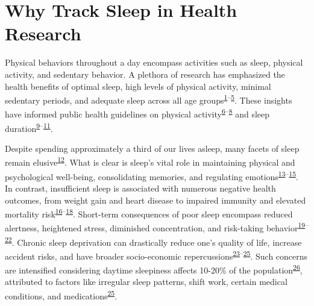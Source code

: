 \documentclass[
  10pt,
]{scrbook}
\begin{document}
\hypertarget{why-track-sleep-in-health-research}{%
\section{Why Track Sleep in Health
Research}\label{why-track-sleep-in-health-research}}

Physical behaviors throughout a day encompass activities such as sleep,
physical activity, and sedentary behavior. A plethora of research has
emphasized the health benefits of optimal sleep, high levels of physical
activity, minimal sedentary periods, and adequate sleep across all age
groups\textsuperscript{\protect\hyperlink{ref-kraus_physical_2019}{1}--\protect\hyperlink{ref-jennum_suxf8vn_sundhed_2015}{5}}.
These insights have informed public health guidelines on physical
activity\textsuperscript{\protect\hyperlink{ref-piercy_physical_2018}{6}--\protect\hyperlink{ref-Sundhedsstyrelsen2023_unge}{8}}
and sleep
duration\textsuperscript{\protect\hyperlink{ref-hirshkowitz_2015}{9}--\protect\hyperlink{ref-watson_2015}{11}}.

Despite spending approximately a third of our lives asleep, many facets
of sleep remain
elusive\textsuperscript{\protect\hyperlink{ref-ma_sleep_2017}{12}}. What
is clear is sleep's vital role in maintaining physical and psychological
well-being, consolidating memories, and regulating
emotions\textsuperscript{\protect\hyperlink{ref-worley_2018}{13}--\protect\hyperlink{ref-scott_2021}{15}}.
In contrast, insufficient sleep is associated with numerous negative
health outcomes, from weight gain and heart disease to impaired immunity
and elevated mortality
risk\textsuperscript{\protect\hyperlink{ref-consensus_conference_panel_recommended_2015}{16}--\protect\hyperlink{ref-hale_2020}{18}}.
Short-term consequences of poor sleep encompass reduced alertness,
heightened stress, diminished concentration, and risk-taking
behavior\textsuperscript{\protect\hyperlink{ref-shochat_2014}{19}--\protect\hyperlink{ref-bonnet_1985}{22}}.
Chronic sleep deprivation can drastically reduce one's quality of life,
increase accident risks, and have broader socio-economic
repercussions\textsuperscript{\protect\hyperlink{ref-connor_2002}{23}--\protect\hyperlink{ref-roth_1996}{25}}.
Such concerns are intensified considering daytime sleepiness affects
10-20\% of the
population\textsuperscript{\protect\hyperlink{ref-wang_2019}{26}},
attributed to factors like irregular sleep patterns, shift work, certain
medical conditions, and
medications\textsuperscript{\protect\hyperlink{ref-roth_1996}{25}}.
\end{document}
